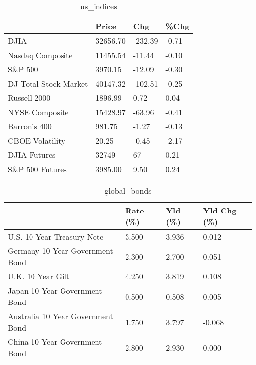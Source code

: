 \documentclass{article}%
\begin{document}
%


\begin{table}[htbp]%
\caption{us\_indices}%
\centering%
\begin{adjustbox}{width=1\textwidth}%
\begin{tabular}{llll}
\toprule
                      &    Price &     Chg &  \%Chg \\
\midrule
                 DJIA & 32656.70 & -232.39 & -0.71 \\
     Nasdaq Composite & 11455.54 &  -11.44 & -0.10 \\
              S\&P 500 &  3970.15 &  -12.09 & -0.30 \\
DJ Total Stock Market & 40147.32 & -102.51 & -0.25 \\
         Russell 2000 &  1896.99 &    0.72 &  0.04 \\
       NYSE Composite & 15428.97 &  -63.96 & -0.41 \\
         Barron's 400 &   981.75 &   -1.27 & -0.13 \\
      CBOE Volatility &    20.25 &   -0.45 & -2.17 \\
         DJIA Futures &    32749 &      67 &  0.21 \\
      S\&P 500 Futures &  3985.00 &    9.50 &  0.24 \\
\bottomrule
\end{tabular}
%
\end{adjustbox}%
\end{table}

%


\begin{table}[htbp]%
\caption{global\_bonds}%
\centering%
\begin{adjustbox}{width=1\textwidth}%
\begin{tabular}{llll}
\toprule
                                  & Rate (\%) & Yld (\%) & Yld Chg (\%) \\
\midrule
       U.S. 10 Year Treasury Note &    3.500 &   3.936 &       0.012 \\
  Germany 10 Year Government Bond &    2.300 &   2.700 &       0.051 \\
                U.K. 10 Year Gilt &    4.250 &   3.819 &       0.108 \\
    Japan 10 Year Government Bond &    0.500 &   0.508 &       0.005 \\
Australia 10 Year Government Bond &    1.750 &   3.797 &      -0.068 \\
    China 10 Year Government Bond &    2.800 &   2.930 &       0.000 \\
\bottomrule
\end{tabular}
%
\end{adjustbox}%
\end{table}
\end{document}
